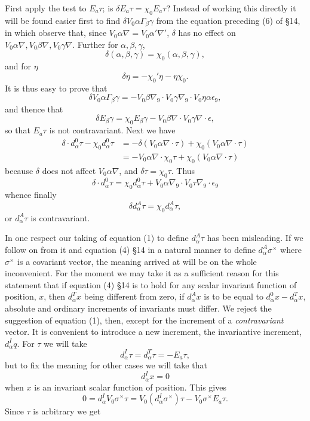 \documentclass[11pt]{article}
\begin{document}
\indent First apply the test to $E_a\tau$; is $\delta E_a\tau=\chi_0E_a\tau$? Instead of working this directly it will be found easier first to find $\delta V_0\alpha\Gamma_\beta\gamma$ from the equation preceding (6) of §14, in which observe that, since $V_0\alpha\nabla=V_0\alpha'\nabla'$, $\delta$ has no effect on $V_0\alpha\nabla,V_0\beta\nabla,V_0\gamma\nabla$. Further for $\alpha,\beta,\gamma$,
\[
\delta(\alpha,\beta,\gamma)=\chi_0(\alpha,\beta,\gamma),
\]
and for $\eta$
\[
\delta\eta=-\chi_0'\eta-\eta\chi_0.
\]
It is thus easy to prove that
\[
\delta V_0\alpha\Gamma_\beta\gamma=-V_0\beta\nabla_9\cdot V_0\gamma\nabla_9\cdot V_0\eta\alpha\epsilon_9,
\]
and thence that
\begin{equation}\delta E_\beta\gamma=\chi_0E_\beta\gamma-V_0\beta\nabla\cdot V_0\gamma\nabla\cdot\epsilon,\tag{4}\end{equation}
so that $E_a\tau$ is not contravariant. Next we have
\[
\begin{aligned}
\delta\cdot d_{\alpha}^{0}\tau-\chi_0d_{\alpha}^{0}\tau&=-\delta(V_0\alpha\nabla\cdot\tau)+\chi_0(V_0\alpha\nabla\cdot\tau)\\
&=-V_0\alpha\nabla\cdot\chi_0\tau+\chi_0(V_0\alpha\nabla\cdot\tau)
\end{aligned}
\]
because $\delta$ does not affect $V_0\alpha\nabla$, and $\delta\tau=\chi_0\tau$. Thus
\[
\delta\cdot d_{\alpha}^{0}\tau=\chi_0d_{\alpha}^{0}\tau+V_0\alpha\nabla_9\cdot V_0\tau\nabla_9\cdot\epsilon_9
\]
whence finally
\[
\delta d_{\alpha}^{A}\tau=\chi_0d_{\alpha}^{A}\tau,
\]
or $d_{\alpha}^{A}\tau$ is contravariant.

\indent In one respect our taking of equation (1) to define $d_{\alpha}^{A}\tau$ has been misleading. If we follow on from it and equation (4) §14 in a natural manner to define $d_{\alpha}^{A}\sigma^\times$ where $\sigma^\times$ is a covariant vector, the meaning arrived at will be on the whole inconvenient. For the moment we may take it as a sufficient reason for this statement that if equation (4) §14 is to hold for any scalar invariant function of position, $x$, then $d_{\alpha}^{T}x$ being different from zero, if $d_{\alpha}^{A}x$ is to be equal to $d_{\alpha}^{0}x-d_{\alpha}^{T}x$, absolute and ordinary increments of invariants must differ. We reject the suggestion of equation (1), then, except for the increment of a \emph{contravariant} vector. It is convenient to introduce a new increment, the invariantive increment, $d_{\alpha}^{I}q$. For $\tau$ we will take
\begin{equation}d_{\alpha}^{I}\tau=d_{\alpha}^{T}\tau=-E_a\tau,\tag{5}\end{equation}
but to fix the meaning for other cases we will take that
\begin{equation}d_{\alpha}^{I}x=0\tag{6}\end{equation}
when $x$ is an invariant scalar function of position. This gives
\[
0=d_{\alpha}^{I}V_0\sigma^\times\tau=V_0(d_{\alpha}^{I}\sigma^\times)\tau-V_0\sigma^\times E_a\tau.
\]
Since $\tau$ is arbitrary we get
\end{document}
